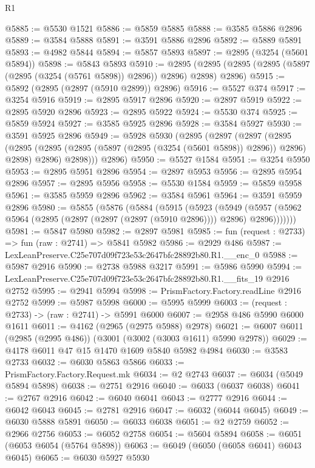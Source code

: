 \begin{lexlean}{R1}
\begin{coremodule}
@5885 := @5530 @1521
@5886 := @5859 @5885
@5888 := @3585 @5886 @2896
@5889 := @3584 @5888
@5891 := @3591 @5886 @2896
@5892 := @5889 @5891
@5893 := @4982 @5844
@5894 := @5857 @5893
@5897 := @2895 (@3254 (@5601 @5894))
@5898 := @5843 @5893
@5910 := @2895 (@2895 (@2895 (@2895 (@5897 (@2895 (@3254 (@5761 @5898)) @2896)) @2896) @2898) @2896)
@5915 := @5892 (@2895 (@2897 (@5910 @2899)) @2896)
@5916 := @5527 @374
@5917 := @3254 @5916
@5919 := @2895 @5917 @2896
@5920 := @2897 @5919
@5922 := @2895 @5920 @2896
@5923 := @2895 @5922
@5924 := @5530 @374
@5925 := @5859 @5924
@5927 := @3585 @5925 @2896
@5928 := @3584 @5927
@5930 := @3591 @5925 @2896
@5949 := @5928
    @5930
    (@2895
      (@2897
        (@2897
          (@2895
            (@2895 (@2895 (@2895 (@5897 (@2895 (@3254 (@5601 @5898)) @2896)) @2896) @2898) @2896)
            @2898)))
      @2896)
@5950 := @5527 @1584
@5951 := @3254 @5950
@5953 := @2895 @5951 @2896
@5954 := @2897 @5953
@5956 := @2895 @5954 @2896
@5957 := @2895 @5956
@5958 := @5530 @1584
@5959 := @5859 @5958
@5961 := @3585 @5959 @2896
@5962 := @3584 @5961
@5964 := @3591 @5959 @2896
@5980 := @5855
    (@5876
      (@5884
        (@5915
          (@5923
            (@5949
              (@5957 (@5962 @5964 (@2895 (@2897 (@2897 (@2897 (@5910 @2896)))) @2896) @2896)))))))
@5981 := @5847 @5980
@5982 := @2897 @5981
@5985 := fun (request : @2733) => fun (raw : @2741) => @5841 @5982
@5986 := @2929 @486
@5987 := LexLeanPreserve.C25e707d09f723e53c2647bfc28892b80.R1.__enc_0
@5988 := @5987 @2916
@5990 := @2738 @5988 @3217
@5991 := @5986 @5990
@5994 := LexLeanPreserve.C25e707d09f723e53c2647bfc28892b80.R1.__fits_19 @2916 @2752
@5995 := @2941 @5994
@5998 := PrismFactory.Factory.readLine @2916 @2752
@5999 := @5987 @5998
@6000 := @5995 @5999
@6003 := (request : @2733) -> (raw : @2741) -> @5991 @6000
@6007 := @2958 @486 @5990 @6000 @1611
@6011 := @4162 (@2965 (@2975 @5988) @2978)
@6021 := @6007 @6011 (@2985 (@2995 @486)) (@3001 (@3002 (@3003 @1611) @5990 @2978))
@6029 := @4178 @6011 @47 @15 @1470 @1609 @5840 @5982 @4984
@6030 := @3583 @2733
@6032 := @6030 @5863 @5866
@6033 := PrismFactory.Factory.Request.mk
@6034 := @2 @2743
@6037 := @6034 (@5049 @5894 @5898)
@6038 := @2751 @2916
@6040 := @6033 (@6037 @6038)
@6041 := @2767 @2916
@6042 := @6040 @6041
@6043 := @2777 @2916
@6044 := @6042 @6043
@6045 := @2781 @2916
@6047 := @6032 (@6044 @6045)
@6049 := @6030 @5888 @5891
@6050 := @6033 @6038
@6051 := @2 @2759
@6052 := @2966 @2756
@6053 := @6052 @2758
@6054 := @5604 @5894
@6058 := @6051 (@6053 @6054 (@5764 @5898))
@6063 := @6049 (@6050 (@6058 @6041) @6043 @6045)
@6065 := @6030 @5927 @5930

\end{coremodule}
\end{lexlean}
